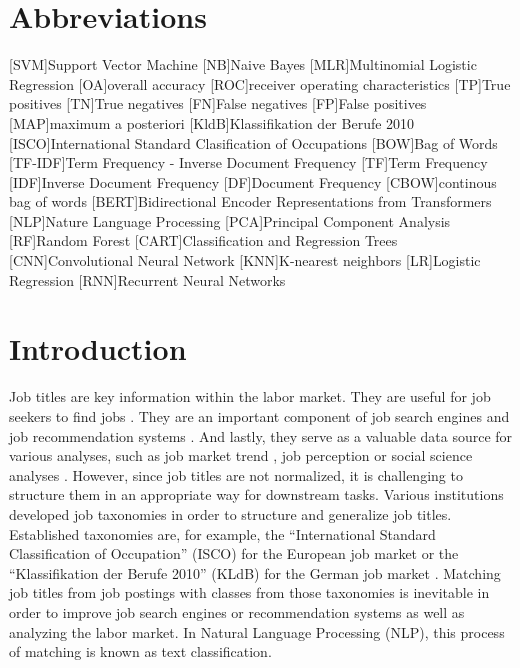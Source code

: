 \documentclass[12pt, a4paper, titlepage]{article}
\begin{document}
\section*{Abbreviations}
\begin{acronym}
  [SVM]{Support Vector Machine}
  [NB]{Naive Bayes}
  [MLR]{Multinomial Logistic Regression}
  [OA]{overall accuracy}
  [ROC]{receiver operating characteristics}
  [TP]{True positives}
  [TN]{True negatives}
  [FN]{False negatives}
  [FP]{False positives}
  [MAP]{maximum a posteriori}
  [KldB]{Klassifikation der Berufe 2010}
  [ISCO]{International Standard Clasification of Occupations}
  [BOW]{Bag of Words}
  [TF-IDF]{Term Frequency - Inverse Document Frequency}
  [TF]{Term Frequency}
  [IDF]{Inverse Document Frequency}
  [DF]{Document Frequency}
  [CBOW]{continous bag of words}
  [BERT]{Bidirectional Encoder  Representations from Transformers}
  [NLP]{Nature Language Processing}
  [PCA]{Principal Component Analysis}
  [RF]{Random Forest}
  [CART]{Classification and Regression Trees}
  [CNN]{Convolutional Neural Network}
  [KNN]{K-nearest neighbors}
  [LR]{Logistic Regression}
  [RNN]{Recurrent Neural Networks}
\end{acronym}
\newpage

\section{Introduction}
Job titles are key information within the labor market. They are useful for job seekers to find jobs \citep{Marinescu2020}. They are an important component of job search engines \citep{Slamet018, Javed2015, Javed2016} and job recommendation systems \citep{Malherbe2014}. And lastly, they serve as a valuable data source for various analyses, such as job market trend \citep{Martin2021, Li2021}, job perception \citep{Smith1989, Bodyston2019} or social science analyses \citep{Martin2021}. However, since job titles are not normalized, it is challenging to structure them in an appropriate way for downstream tasks. Various institutions developed job taxonomies in order to structure and generalize job titles. Established taxonomies are, for example, the ``International Standard Classification of Occupation'' (ISCO) for the European job market or the ``Klassifikation der Berufe 2010'' (KLdB) for the German job market \citep{Uter2020}. Matching job titles from job postings with classes from those taxonomies is inevitable in order to improve job search engines or recommendation systems as well as analyzing the labor market. In Natural Language Processing (NLP), this process of matching is known as text classification. 
\end{document}
